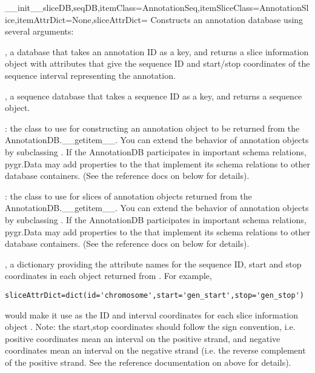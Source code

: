 \documentclass{howto}
\begin{document}
\begin{funcdesc}{__init__}{sliceDB,seqDB,itemClass=AnnotationSeq,itemSliceClass=AnnotationSlice,itemAttrDict=None,sliceAttrDict={}}
  Constructs an annotation database using several arguments:

  , a database that takes an annotation ID as a key, and returns
  a slice information object with attributes that give the sequence ID and start/stop
  coordinates of the sequence interval representing the annotation.

  , a sequence database that takes a sequence ID as a key, and
  returns a sequence object.

  : the class to use for constructing an annotation object 
  to be returned from the AnnotationDB.__getitem__.  You can extend the
  behavior of annotation objects by subclassing .
  If the AnnotationDB participates in important schema relations,
  pygr.Data may add properties to the  that implement
  its schema relations to other database containers.  (See the reference
  docs on  below for details).

  : the class to use for slices of annotation
  objects returned from the AnnotationDB.__getitem__.  You can extend the
  behavior of annotation objects by subclassing .
  If the AnnotationDB participates in important schema relations,
  pygr.Data may add properties to the  that implement
  its schema relations to other database containers.  (See the reference
  docs on  below for details).

  , a dictionary providing the attribute names for the
  sequence ID, start and stop coordinates in each object returned from .
  For example,
\begin{verbatim}
sliceAttrDict=dict(id='chromosome',start='gen_start',stop='gen_stop')
\end{verbatim}
  would make it use  as the ID and interval
  coordinates for each slice information object .  Note: the start,stop
  coordinates should follow the  sign convention, i.e. positive
  coordinates mean an interval on the positive strand, and negative coordinates
  mean an interval on the negative strand (i.e. the reverse complement of
  the positive strand.  See the reference documentation on  above
  for details).
\end{funcdesc}
\end{document}
